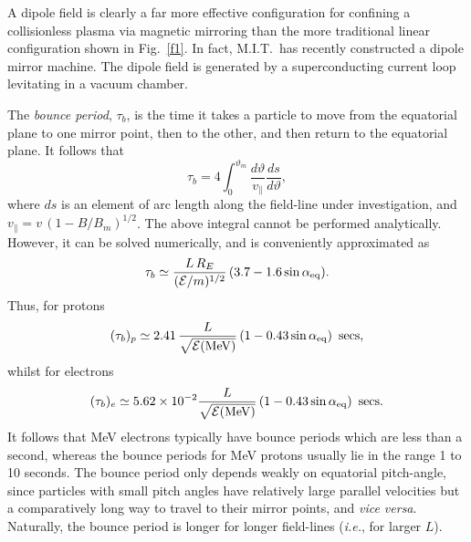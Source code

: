 A dipole field is clearly a far more effective configuration for 
confining a collisionless plasma via magnetic mirroring
 than the more traditional linear configuration 
 shown in Fig.~\ref{f1}. In fact, M.I.T.\ has recently constructed a dipole
 mirror machine. The dipole field is generated by a
superconducting current loop levitating in a vacuum chamber. 

The {\em bounce period}, $\tau_b$, is the time it takes a particle to move
from the equatorial plane to one mirror point, then to the other, and then return
to the equatorial plane. It follows that
\begin{equation}
\tau_b = 4\int_0^{\vartheta_m} \frac{d\vartheta}{v_\parallel}\frac{ds}{d\vartheta},
\end{equation}
where $ds$ is an element of arc length along the field-line under investigation,
and $v_\parallel = v\,(1-B/B_m)^{1/2}$. The above integral cannot
be performed analytically. However, it can be solved numerically, and is
conveniently  approximated as
\begin{equation}
\tau_b \simeq \frac{L\,R_E}{({\cal E}/m)^{1/2}} \,(3.7-1.6\sin\alpha_{\rm eq}).
\end{equation}
Thus, for protons 
\begin{equation}
(\tau_b)_p \simeq 2.41\,\frac{L}
{\sqrt{{\cal E}({\rm MeV})}} \,(1- 0.43 \sin\alpha_{\rm eq})\,\,\,{\rm secs},
\end{equation}
whilst for electrons
\begin{equation}
(\tau_b)_e \simeq 5.62\times 10^{-2}\frac{L}{\sqrt{{\cal E}({\rm MeV})}} \,(1- 0.43 \sin\alpha_{\rm eq})\,\,\,{\rm secs}.
\end{equation}
It follows that  MeV electrons typically have bounce periods which are less than
a second, whereas the bounce periods for MeV protons usually lie in the range 1 to
10 seconds. The bounce period only depends weakly on equatorial
pitch-angle, since particles with small pitch angles have relatively
large parallel velocities but a comparatively long way to travel to their
mirror points, and {\em vice versa}. Naturally, the bounce period
is longer for longer field-lines ({\em i.e.}, for larger $L$). 

